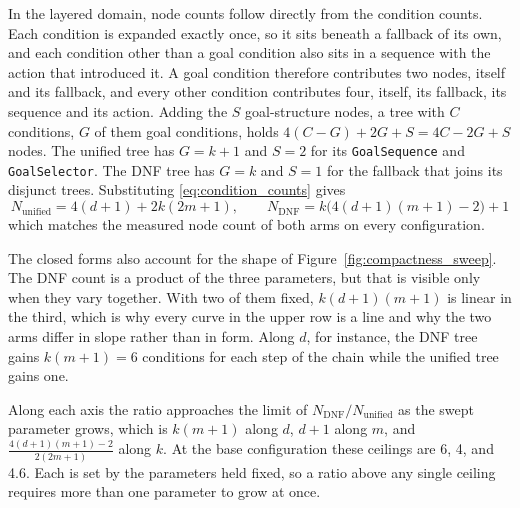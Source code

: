     In the layered domain, node counts follow directly from the condition counts.
    Each condition is expanded exactly once, so it sits beneath a fallback of its own, and each condition other than a goal condition also sits in a sequence with the action that introduced it.
    A goal condition therefore contributes two nodes, itself and its fallback, and every other condition contributes four, itself, its fallback, its sequence and its action.
    Adding the $S$ goal-structure nodes, a tree with $C$ conditions, $G$ of them goal conditions, holds $4(C - G) + 2G + S = 4C - 2G + S$ nodes.
    The unified tree has $G = k + 1$ and $S = 2$ for its \texttt{GoalSequence} and \texttt{GoalSelector}.
    The DNF tree has $G = k$ and $S = 1$ for the fallback that joins its disjunct trees.
    Substituting \eqref{eq:condition_counts} gives
    \begin{equation}
        N_{\text{unified}} = 4(d+1) + 2k(2m+1), \qquad
        N_{\text{DNF}} = k\bigl(4(d+1)(m+1) - 2\bigr) + 1
        \label{eq:node_counts}
    \end{equation}
    which matches the measured node count of both arms on every configuration.

    \label{subsec:compactness_curve_shape}
    The closed forms also account for the shape of Figure~\ref{fig:compactness_sweep}.
    The DNF count is a product of the three parameters, but that is visible only when they vary together.
    With two of them fixed, $k(d+1)(m+1)$ is linear in the third, which is why every curve in the upper row is a line and why the two arms differ in slope rather than in form.
    Along $d$, for instance, the DNF tree gains $k(m+1) = 6$ conditions for each step of the chain while the unified tree gains one.

    Along each axis the ratio approaches the limit of $N_{\text{DNF}} / N_{\text{unified}}$ as the swept parameter grows, which is $k(m+1)$ along $d$, $d+1$ along $m$, and $\frac{4(d+1)(m+1)-2}{2(2m+1)}$ along $k$.
    At the base configuration these ceilings are 6, 4, and 4.6.
    Each is set by the parameters held fixed, so a ratio above any single ceiling requires more than one parameter to grow at once.

